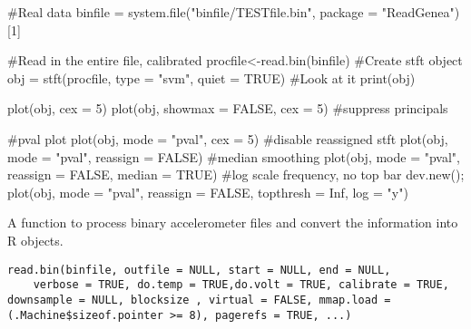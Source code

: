 \documentclass[a4paper]{book}
\begin{document}
\begin{Examples}
\begin{ExampleCode}

#Real data
binfile  = system.file("binfile/TESTfile.bin", package = "ReadGenea")[1]

#Read in the entire file, calibrated
procfile<-read.bin(binfile)
#Create stft object
obj = stft(procfile, type = "svm", quiet = TRUE)
#Look at it
print(obj)

plot(obj, cex = 5)
plot(obj, showmax = FALSE, cex = 5) #suppress principals

#pval plot
plot(obj, mode = "pval", cex = 5)
#disable reassigned stft
plot(obj, mode = "pval", reassign = FALSE) 
#median smoothing
plot(obj, mode = "pval", reassign = FALSE, median = TRUE) 
#log scale frequency, no top bar
dev.new(); plot(obj, mode = "pval", reassign = FALSE, topthresh = Inf, log = "y") 
\end{ExampleCode}
\end{Examples}
%
\begin{Description}\relax
A function to process binary accelerometer files and convert the information into R objects.
\end{Description}
%
\begin{Usage}
\begin{verbatim}
read.bin(binfile, outfile = NULL, start = NULL, end = NULL, 
    verbose = TRUE, do.temp = TRUE,do.volt = TRUE, calibrate = TRUE, downsample = NULL, blocksize , virtual = FALSE, mmap.load = (.Machine$sizeof.pointer >= 8), pagerefs = TRUE, ...)
\end{verbatim}
\end{Usage}
%
\end{document}
